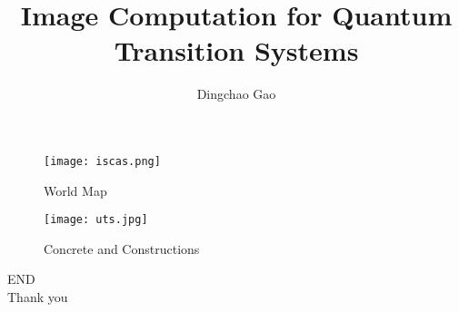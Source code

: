 \documentclass[aspectratio=1610]{beamer}
\title[TDD in quantum]{Image Computation for Quantum Transition Systems}
\author[Gcc]{Dingchao Gao}
\begin{document}
\begin{frame}[plain]
  \titlepage
  \begin{figure}
    \centering
    \begin{minipage}[t]{0.48\textwidth}
    \centering
    \texttt{[image: iscas.png]}
    \caption{World Map}
    \end{minipage}
    \begin{minipage}[t]{0.48\textwidth}
    \centering
    \texttt{[image: uts.jpg]}
    \caption{Concrete and Constructions}
    \end{minipage}
  \end{figure}
\end{frame}

\begin{frame}
\centering
\Huge{END\\Thank you}
\end{frame}
\end{document}

